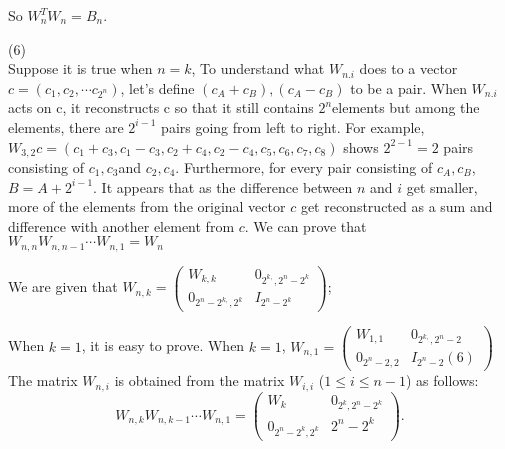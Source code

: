 \documentclass[12pt]{article}
\begin{document}
So $W_n^TW_n = B_n$.\\

\medskip

(6) \\
Suppose it is true when $n = k$, 
To understand what $W_{n.i}$ does to a vector $c=(c_{1},c_{2},\cdots c_{2^{n}})$,
let's define $(c_{A}+c_{B}),(c_{A}-c_{B})$ to be a pair. When $W_{n.i}$
acts on c, it reconstructs c so that it still contains $2^{n}$elements
but among the elements, there are $2^{i-1}$ pairs going from left
to right. For example, $W_{3,2}c=(c_{1}+c_{3},c_{1}-c_{3},c_{2}+c_{4},c_{2}-c_{4},c_{5},c_{6},c_{7},c_{8})$
shows $2^{2-1}=2$ pairs consisting of $c_{1},c_{3}$and $c_{2},c_{4}.$
Furthermore, for every pair consisting of $c_{A},c_{B}$, $B=A+2^{i-1}$.
It appears that as the difference between $n$ and $i$ get smaller,
more of the elements from the original vector $c$ get reconstructed
as a sum and difference with another element from $c$. We can prove that $W_{n,n}W_{n,n-1}\cdots W_{n,1}=W_{n}$

We are given that $W_{n,k}=\begin{pmatrix}W_{k,k} & 0_{2^{k,},2^{n}-2^{k}}\\
0_{2^{n}-2^{k,},2^{k}} & I_{2^{n}-2^{k}}
\end{pmatrix}$; 

When $k = 1$, it is easy to prove. When $k=1$, $W_{n,1}=\begin{pmatrix}W_{1,1} & 0_{2^{k,},2^{n}-2}\\
0_{2^{n}-2,2} & I_{2^{n}-2}(6)\end{pmatrix}$
The matrix $W_{n, i}$ is obtained from the matrix $W_{i, i}$
($1 \leq i \leq n - 1$) as follows:
\[
W_{n, k} W_{n, k - 1}\cdots W_{n, 1} = 
\begin{pmatrix}
 W_{k} & 0_{2^{k}, 2^{n} - 2^{k}} \\
0_{2^{n}- 2^{k}, 2^k} & {2^{n} - 2^{k}} 
\end{pmatrix}.
\]
\end{document}
